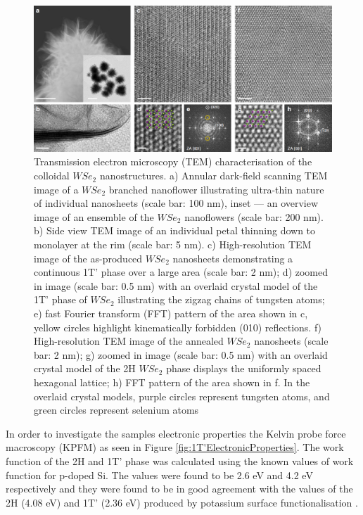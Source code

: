 \begin{figure}[!h]
	\begin{center}
		\includegraphics[scale=0.3]{1T'/TEMMaps.png}
		\caption{Transmission electron microscopy (TEM) characterisation of the colloidal $WSe_2$ nanostructures. a) Annular dark-field scanning TEM image of a $WSe_2$ branched nanoflower illustrating ultra-thin nature of individual nanosheets (scale bar: 100 nm), inset — an overview image of an ensemble of the $WSe_2$ nanoflowers (scale bar: 200 nm). b) Side view TEM image of an individual petal thinning down to monolayer at the rim (scale bar: 5 nm). c) High-resolution TEM image of the as-produced $WSe_2$ nanosheets demonstrating a continuous 1T’ phase over a large area (scale bar: 2 nm); d) zoomed in image (scale bar:
0.5 nm) with an overlaid crystal model of the 1T’ phase of $WSe_2$ illustrating the zigzag chains of tungsten atoms; e) fast Fourier transform (FFT) pattern of the area shown in c, yellow circles highlight kinematically forbidden (010) reflections. f) High-resolution TEM image of the annealed $WSe_2$ nanosheets (scale bar: 2 nm); g) zoomed in image (scale bar: 0.5 nm) with an overlaid crystal model of the 2H $WSe_2$ phase displays the uniformly spaced hexagonal lattice; h) FFT pattern of the area shown in f. In the overlaid crystal models, purple circles represent tungsten atoms, and green circles represent selenium atoms}
		\label{fig:1T'TEMMaps}
	\end{center}
\end{figure}

In order to investigate the samples electronic properties the Kelvin probe force macroscopy (KPFM) as seen in Figure \ref{fig:1T'ElectronicProperties}. The work function of the 2H and 1T' phase was calculated using the known values of work function for p-doped Si. The values were found to be 2.6 eV and 4.2 eV respectively and they were found to be in good agreement with the values of the 2H (4.08 eV) and 1T' (2.36 eV) produced by potassium surface functionalisation \cite{Lei2018}. 

